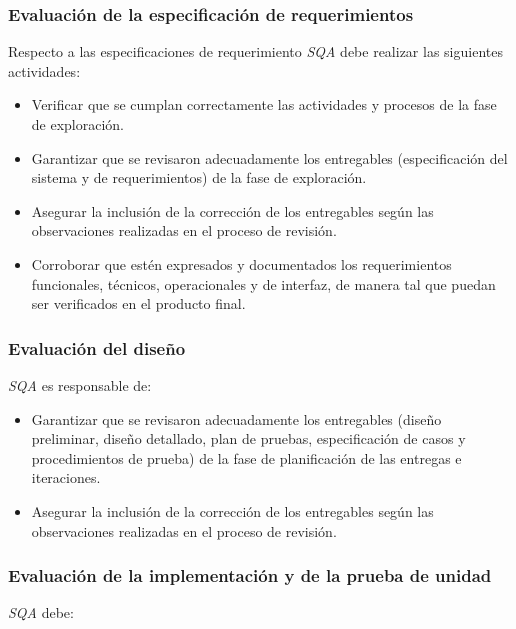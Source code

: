 \subsubsection{Evaluación de la especificación de requerimientos}

Respecto a las especificaciones de requerimiento \textit{SQA} debe realizar las siguientes actividades:

	\begin{itemize}
		\item 
		Verificar que se cumplan correctamente las actividades y procesos de la fase de exploración.
		\item
		Garantizar que se revisaron adecuadamente los entregables (especificación del sistema y de requerimientos) de la fase de exploración. 
		\item
		Asegurar la inclusión de la corrección de los entregables según las observaciones realizadas en el proceso de revisión. 
		\item
		Corroborar que estén expresados y documentados los requerimientos funcionales, técnicos, operacionales y de interfaz, de manera tal que puedan ser verificados en el producto final.
	\end{itemize}

\subsubsection{Evaluación del diseño}

\textit{SQA} es responsable de:

	\begin{itemize}
		\item 
		Garantizar que se revisaron adecuadamente los entregables (diseño preliminar, diseño detallado, plan de pruebas, especificación de casos y procedimientos de prueba) de la fase de planificación de las entregas e iteraciones.
		\item
		Asegurar la inclusión de la corrección de los entregables según las observaciones realizadas en el proceso de revisión.
	\end{itemize}
	
\subsubsection{Evaluación de la implementación y de la prueba de unidad}

\textit{SQA} debe:

